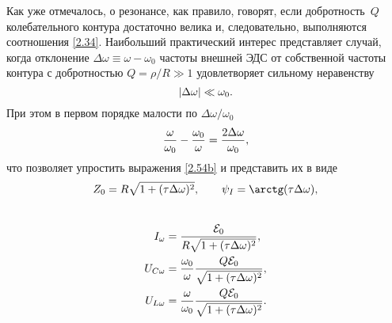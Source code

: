 Как уже отмечалось, о резонансе, как правило, говорят, если добротность~$Q$
колебательного контура достаточно велика и, следовательно, выполняются
соотношения \eqref{2.34}. Наибольший практический интерес представляет случай,
когда отклонение $\Delta\omega\equiv\omega-\omega_0$ частоты внешней ЭДС от
собственной частоты контура с добротностью $Q=\rho/R\gg1$ удовлетворяет сильному
неравенству
\begin{equation}\eqmark{2.58}
	|\Delta\omega|\ll\omega_0.
\end{equation}
При этом в первом порядке малости по  $\Delta\omega/\omega_0$
\begin{equation}\eqmark{2.59}
\dfrac{\omega}{\omega_0}-\dfrac{\omega_0}{\omega}=
\dfrac{2\Delta\omega}{\omega_0},
\end{equation}
что позволяет упростить выражения \eqref{2.54b} и представить их в виде
		\begin{equation}
			\eqmark{2.60a}
			Z_0=R\sqrt{1+(\tau\Delta\omega)^2}, \qquad
\psi_I=\arctg(\tau\Delta\omega),
		\end{equation}\\
		\begin{equation}
			\eqmark{2.60b}
			\begin{aligned}
			I_{\omega}&=\dfrac{\mathcal{E}_0}{R\sqrt{1+(\tau\Delta\omega)^2}},\\
U_{C\omega}&=\frac{\omega_0}{\omega}\dfrac{Q\mathcal{E}_0}{\sqrt{1+(\tau\Delta\omega)^2
}},\\
U_{L\omega}&=\frac{\omega}{\omega_0}\dfrac{Q\mathcal{E}_0}{\sqrt{1+(\tau\Delta\omega)^2
}}.
			\end{aligned}
		\end{equation}


